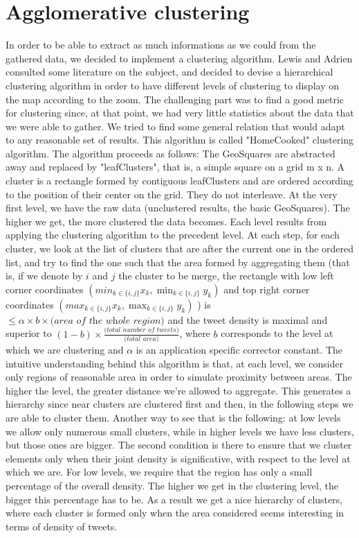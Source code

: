 \section{ Agglomerative clustering}
\label{sec:agg_clustering}
In order to be able to extract as much informations as we could from the gathered data, we decided to implement a clustering algorithm. Lewis and Adrien consulted some literature on the subject, and decided to devise a hierarchical clustering algorithm in order to have different levels of clustering to display on the map according to the zoom. 
The challenging part was to find a good metric for clustering since, at that point, we had very little statistics about the data that we were able to gather. We tried to find some general relation that would adapt to any reasonable set of results. This algorithm is called "HomeCooked" clustering algorithm.
The algorithm proceeds as follows: 
The GeoSquares are abstracted away and replaced by "leafClusters", that is, a simple square on a grid m x n. A cluster is a rectangle formed by contiguous leafClusters and are ordered according to the position of their center on the grid. They do not interleave. 
At the very first level, we have the raw data (unclustered results, the basic GeoSquares). The higher we get, the more clustered the data becomes. 
Each level results from applying the clustering algorithm to the precedent level. 
At each step, for each cluster, we look at the list of clusters that are after the current one in the ordered list, and try to find the one such that the area formed by aggregating them (that is, if we denote by $i$ and $j$ the cluster to be merge, the rectangle with low left corner coordinates $(min_{k\in \{i,j\} } x_k, \min_{k\in \{i,j\}} y_k )$ and top right corner coordinates $(max_{k\in \{i,j\}} x_k, \max_{k\in \{i,j\} } y_k)$ ) is $\leq \alpha \times b \times \textit{(area of the whole region)}$ and the tweet density is maximal and superior to $(1-b)\times \frac{\textit{(total number of tweets)}}{\textit{(total area)}}$, where $b$ corresponds to the level at which we are clustering and $\alpha$ is an application specific corrector constant. 
The intuitive understanding behind this algorithm is that, at each level, we consider only regions of reasonable area in order to simulate proximity between areas. The higher the level, the greater distance we're allowed to aggregate. This generates a hierarchy since near clusters are clustered first and then, in the following steps we are able to cluster them. Another way to see that is the following: at low levels we allow only numerous small clusters, while in higher levels we have less clusters, but those ones are bigger. The second condition is there to ensure that we cluster elements only when their joint density is significative, with respect to the level at which we are. For low levels, we require that the region has only a small percentage of the overall density. The higher we get in the clustering level, the bigger this percentage has to be. As a result we get a nice hierarchy of clusters, where each cluster is formed only when the area considered seems interesting in terms of density of tweets. 
